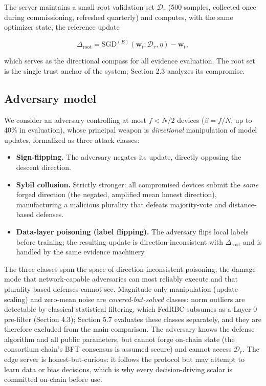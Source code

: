 \documentclass[cmc,article,submit,moreauthors,pdftex]{Definitions/tsp}
\begin{document}
The server maintains a small root validation set $\mathcal{D}_r$ (500 samples, collected once during commissioning, refreshed quarterly) and computes, with the same optimizer state, the reference update

\begin{equation}
\Delta_{\mathrm{root}} = \mathrm{SGD}^{(E)}(\mathbf{w}_t; \mathcal{D}_r, \eta) - \mathbf{w}_t,
\tag{3}
\end{equation}

which serves as the directional compass for all evidence evaluation. The root set is the single trust anchor of the system; Section 2.3 analyzes its compromise.

\subsection{Adversary model}\label{sec:adversary-model}

We consider an adversary controlling at most $f < N/2$ devices ($\beta = f/N$, up to 40\% in evaluation), whose principal weapon is \emph{directional} manipulation of model updates, formalized as three attack classes:

\begin{itemize}
\item \textbf{Sign-flipping.} The adversary negates its update, directly opposing the descent direction.
\item \textbf{Sybil collusion.} Strictly stronger: all compromised devices submit the \emph{same} forged direction (the negated, amplified mean honest direction), manufacturing a malicious plurality that defeats majority-vote and distance-based defenses.
\item \textbf{Data-layer poisoning (label flipping).} The adversary flips local labels before training; the resulting update is direction-inconsistent with $\Delta_{\mathrm{root}}$ and is handled by the same evidence machinery.
\end{itemize}

The three classes span the space of direction-inconsistent poisoning, the damage mode that network-capable adversaries can most reliably execute and that plurality-based defenses cannot see. Magnitude-only manipulation (update scaling) and zero-mean noise are \emph{covered-but-solved} classes: norm outliers are detectable by classical statistical filtering, which FedRBC subsumes as a Layer-0 pre-filter (Section 4.3); Section 5.7 evaluates these classes separately, and they are therefore excluded from the main comparison. The adversary knows the defense algorithm and all public parameters, but cannot forge on-chain state (the consortium chain's BFT consensus is assumed secure) and cannot access $\mathcal{D}_r$. The edge server is honest-but-curious: it follows the protocol but may attempt to learn data or bias decisions, which is why every decision-driving scalar is committed on-chain before use.
\end{document}
